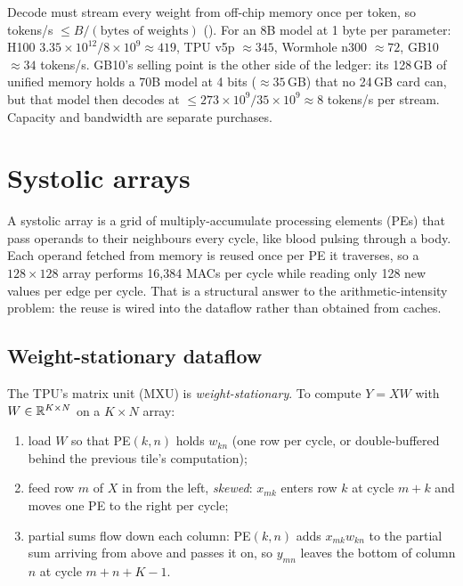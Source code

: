 \begin{napkinmath}
Decode must stream every weight from off-chip memory once per token, so tokens/s $\le B/(\text{bytes of
weights})$ (). For an 8B model at 1 byte per parameter:
H100 $3.35\times10^{12}/8\times10^9 \approx 419$, TPU v5p $\approx 345$, Wormhole n300
$\approx 72$, GB10 $\approx 34$ tokens/s. GB10's selling point is the other side of the ledger: its
128\,GB of unified memory holds a 70B model at 4 bits ($\approx35$\,GB) that no 24\,GB card
can, but that model then decodes at $\le 273\times10^{9}/35\times10^{9}\approx 8$ tokens/s per
stream. Capacity and bandwidth are separate purchases.
\end{napkinmath}

\section{Systolic arrays}\label{sec:accel:systolic}

A systolic array is a grid of multiply-accumulate processing elements (PEs) that pass operands
to their neighbours every cycle, like blood pulsing through a body. Each operand fetched from
memory is reused once per PE it traverses, so a $128\times128$ array performs 16,384 MACs per
cycle while reading only 128 new values per edge per cycle. That is a structural answer to the
arithmetic-intensity problem: the reuse is wired into the dataflow rather than obtained
from caches.

\subsection{Weight-stationary dataflow}

The TPU's matrix unit (MXU) is \emph{weight-stationary}. To compute $Y = XW$ with
$W\in\mathbb{R}^{K\times N}$ on a $K\times N$ array:

\begin{enumerate}
  \item load $W$ so that PE$(k,n)$ holds $w_{kn}$ (one row per cycle, or double-buffered behind the
    previous tile's computation);
  \item feed row $m$ of $X$ in from the left, \emph{skewed}: $x_{mk}$ enters row $k$ at cycle $m+k$
    and moves one PE to the right per cycle;
  \item partial sums flow down each column: PE$(k,n)$ adds $x_{mk}w_{kn}$ to the partial sum arriving from
    above and passes it on, so $y_{mn}$ leaves the bottom of column $n$ at cycle $m+n+K-1$.
\end{enumerate}

